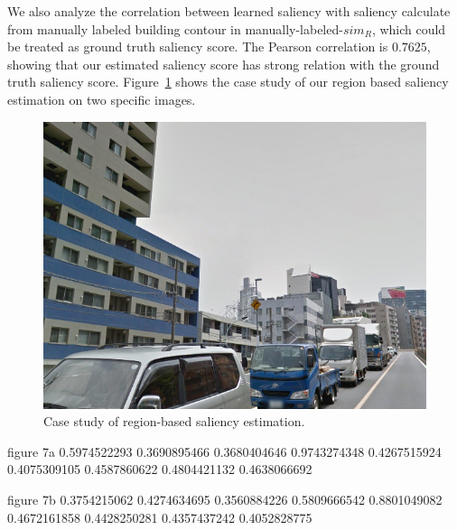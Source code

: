 We also analyze the correlation between learned saliency with saliency calculate from manually labeled building contour in manually-labeled-$sim_R$, which could be treated as ground truth saliency score. 
The Pearson correlation is $0.7625$, showing that our estimated saliency score has strong relation with the ground truth saliency score.
Figure~\ref{fig:saliencycasestudy} shows the case study of our region based saliency estimation on two specific images. 

\begin{figure}
\includegraphics[width=0.8\linewidth]{img/case_study}
\caption{\label{fig:saliencycasestudy}Case study of region-based saliency estimation.}
\end{figure}
figure 7a
0.5974522293
0.3690895466
0.3680404646
0.9743274348
0.4267515924
0.4075309105
0.4587860622
0.4804421132
0.4638066692

figure 7b
0.3754215062
0.4274634695
0.3560884226
0.5809666542
0.8801049082
0.4672161858
0.4428250281
0.4357437242
0.4052828775